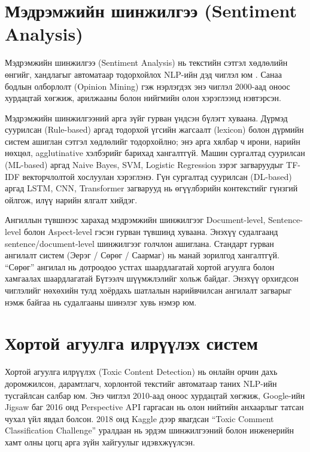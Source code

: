 \section{Мэдрэмжийн шинжилгээ (Sentiment Analysis)}

Мэдрэмжийн шинжилгээ (Sentiment Analysis) нь текстийн сэтгэл хөдлөлийн өнгийг,
хандлагыг автоматаар тодорхойлох NLP-ийн дэд чиглэл юм \cite{liu2012}. Санаа
бодлын олборлолт (Opinion Mining) гэж нэрлэгдэх энэ чиглэл 2000-аад оноос
хурдацтай хөгжиж, арилжааны болон нийгмийн олон хэрэглээнд нэвтэрсэн.

Мэдрэмжийн шинжилгээний арга зүйг гурван үндсэн бүлэгт хуваана. Дүрмэд
суурилсан (Rule-based) аргад тодорхой үгсийн жагсаалт (lexicon) болон дүрмийн
систем ашиглан сэтгэл хөдлөлийг тодорхойлно; энэ арга хялбар ч ирони, нарийн
нөхцөл, agglutinative хэлбэрийг барихад хангалтгүй. Машин сургалтад суурилсан
(ML-based) аргад Naive Bayes, SVM, Logistic Regression зэрэг загваруудыг
TF-IDF векторчлолтой хослуулан хэрэглэнэ. Гүн сургалтад суурилсан (DL-based)
аргад LSTM, CNN, Transformer загварууд нь өгүүлбэрийн контекстийг гүнзгий
ойлгож, илүү нарийн ялгалт хийдэг.

Ангиллын түвшнээс харахад мэдрэмжийн шинжилгээг Document-level, Sentence-level
болон Aspect-level гэсэн гурван түвшинд хуваана. Энэхүү судалгаанд
sentence/document-level шинжилгээг голчлон ашиглана. Стандарт гурван ангилалт
систем (Эерэг / Сөрөг / Саармаг) нь манай зорилгод хангалтгүй.
``Сөрөг'' ангилал нь дотроодоо устгах шаардлагатай хортой агуулга болон
хамгаалах шаардлагатай Бүтээлч шүүмжлэлийг хольж байдаг. Энэхүү орхигдсон чиглэлийг
нөхөхийн тулд хоёрдахь шатлалын нарийвчилсан ангилалт загварыг нэмж байгаа нь
судалгааны шинэлэг хувь нэмэр юм.

\section{Хортой агуулга илрүүлэх систем}

Хортой агуулга илрүүлэх\linebreak[0]{} (Toxic Content Detection) нь онлайн
орчин дахь доромжилсон, дарамтлагч, хорлонтой текстийг автоматаар таних NLP-ийн
тусгайлсан салбар юм. Энэ чиглэл 2010-аад оноос хурдацтай хөгжиж, Google-ийн
Jigsaw баг 2016 онд Perspective API гаргасан нь олон нийтийн анхаарлыг татсан
чухал үйл явдал болсон. 2018 онд Kaggle дээр явагдсан ``Toxic Comment
Classification Challenge'' уралдаан нь эрдэм шинжилгээний болон инженерийн
хамт олны цогц арга зүйн хайгуулыг идэвхжүүлсэн.

